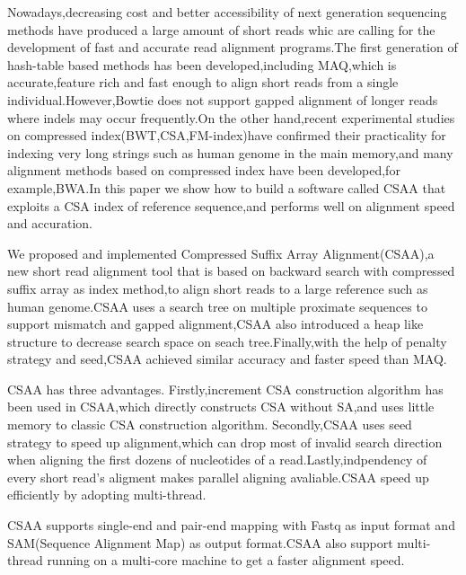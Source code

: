 \begin{englishabstract}

\setlength\parindent{0em}

\vspace{2ex}
Nowadays,decreasing cost and better accessibility of next generation sequencing methods
have produced a large amount of short reads whic are calling for the development of fast
and accurate read alignment programs.The first generation of hash-table based methods has
been developed,including MAQ,which is accurate,feature rich and fast enough to align short
reads from a single individual.However,Bowtie does not support gapped alignment of longer reads
where indels may occur frequently.On the other hand,recent experimental studies on compressed
index(BWT,CSA,FM-index)have confirmed their practicality for indexing very long strings such
as human genome in the main memory,and many alignment methods based on compressed index have
been developed,for example,BWA.In this paper we show how to build a software called CSAA that
exploits a CSA index of reference sequence,and performs well on alignment speed and accuration.

\vspace{2ex}
We proposed and implemented Compressed Suffix Array Alignment(CSAA),a new short read alignment
tool that is based on backward search with compressed suffix array as index method,to align short reads to a
large reference such as human genome.CSAA uses a search tree on multiple proximate sequences to
support mismatch and gapped alignment,CSAA also introduced a heap like structure to decrease
search space on seach tree.Finally,with the help of penalty strategy and seed,CSAA achieved
similar accuracy and faster speed than MAQ.


\vspace{2ex}
CSAA has three advantages. Firstly,increment CSA construction algorithm has been used in
CSAA,which directly constructs CSA without SA,and uses little memory to classic CSA construction algorithm.
Secondly,CSAA uses seed strategy to speed up alignment,which can drop most of invalid
search direction when aligning the first dozens of nucleotides of a read.Lastly,indpendency of
every short read's aligment makes parallel aligning avaliable.CSAA speed up efficiently by
adopting multi-thread.

\vspace{2ex}
CSAA supports single-end and pair-end mapping with Fastq as input format and SAM(Sequence Alignment Map)
as output format.CSAA also support multi-thread running on a multi-core machine to get a faster
alignment speed.




\end{englishabstract}

